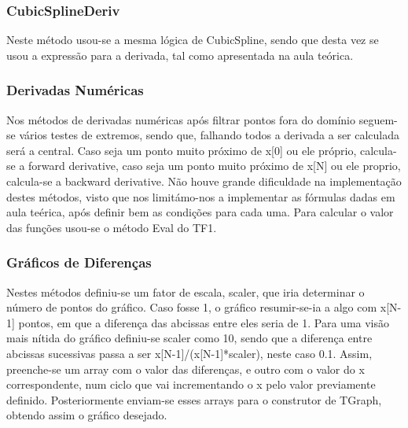 \documentclass{article}
\begin{document}
\begin{multicols}{2}
  \subsubsection{CubicSplineDeriv}
  Neste método usou-se a mesma lógica de CubicSpline, sendo que desta vez se usou a expressão para a derivada, tal como apresentada na aula teórica.

  \subsubsection{Derivadas Numéricas}
  Nos métodos de derivadas numéricas após filtrar pontos fora do domínio seguem-se vários testes de extremos, sendo que, falhando todos a derivada a ser calculada será a central. Caso seja um ponto muito próximo de x[0] ou ele próprio, calcula-se a forward derivative, caso seja um ponto muito próximo de x[N] ou ele proprio, calcula-se a backward derivative. Não houve grande dificuldade na implementação destes métodos, visto que nos limitámo-nos a implementar as fórmulas dadas em aula teérica, após definir bem as condições para cada uma. Para calcular o valor das funções usou-se o método Eval do TF1.

  \subsubsection{Gráficos de Diferenças}
  Nestes métodos definiu-se um fator de escala, scaler, que iria determinar o número de pontos do gráfico. Caso fosse 1, o gráfico resumir-se-ia a algo com x[N-1] pontos, em que a diferença das abcissas entre eles seria de 1. Para uma visão mais nítida do gráfico definiu-se scaler como 10, sendo que a diferença entre abcissas sucessivas passa a ser x[N-1]/(x[N-1]*scaler), neste caso 0.1. Assim, preenche-se um array com o valor das diferenças, e outro com o valor do x correspondente, num ciclo que vai incrementando o x pelo valor previamente definido. Posteriormente enviam-se esses arrays para o construtor de TGraph, obtendo assim o gráfico desejado.


\end{multicols}
\end{document}
